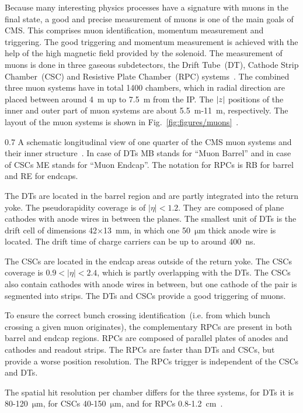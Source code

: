 Because many interesting physics processes have a signature with muons in the final state, a good and precise measurement of muons is one of the main goals of CMS. This comprises muon identification, momentum measurement and triggering. The good triggering and momentum measurement is achieved with the help of the high magnetic field provided by the solenoid. The measurement of muons is done in three gaseous subdetectors, the Drift Tube~(DT), Cathode Strip Chamber~(CSC) and Resistive Plate Chamber~(RPC) systems~\cite{tdrMuon}. The combined three muon systems have in total 1400 chambers, which in radial direction are placed between around 4~m up to 7.5~m from the IP. The $\abs{z}$ positions of the inner and outer part of muon systems are about 5.5~m-11~m, respectively. The layout of the muon systems is shown in Fig.~\ref{fig:figures/muons}~\cite{Chatrchyan:2013sba}.

                 {0.7}       
                 {A schematic longitudinal view of one quarter of the CMS muon systems and their inner structure~\cite{Chatrchyan:2013sba}. In case of DTs MB stands for ``Muon Barrel'' and in case of CSCs ME stands for ``Muon Endcap''. The notation for RPCs is RB for barrel and RE for endcaps. }

The DTs are located in the barrel region and are partly integrated into the return yoke.  The pseudorapidity coverage is of $|\eta|<1.2$. They are composed of plane cathodes with anode wires in between the planes. The smallest unit of DTs is the drift cell of dimensions 42$\times$13~mm, in which one 50~$\mathrm{\mu m}$ thick anode wire is located. The drift time of charge carriers can be up to around 400~ns.

The CSCs are located in the endcap areas outside of the return yoke. The CSCs coverage is $0.9<|\eta|<2.4$, which is partly overlapping with the DTs. The CSCs also contain cathodes with anode wires in between, but one cathode of the pair is segmented into strips. The DTs and CSCs provide a good triggering of muons.

To ensure the correct bunch crossing identification~(i.e. from which bunch crossing a given muon originates), the complementary RPCs are present in both barrel and endcap regions. RPCs are composed of parallel plates of anodes and cathodes and readout strips. The RPCs are faster than DTs and CSCs, but provide a worse position resolution. The RPCs trigger is independent of the CSCs and DTs.  

The spatial hit resolution per chamber differs for the three systems, for DTs it is 80-120~$\mathrm{\mu m}$, for CSCs 40-150~$\mathrm{\mu m}$, and for RPCs 0.8-1.2~$\mathrm{cm}$~\cite{Chatrchyan:2013sba}.


